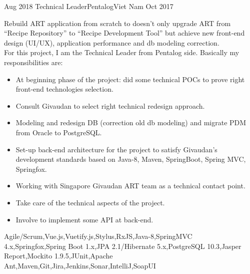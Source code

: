 \begin{experiences}
\experience
  {Aug 2018}  {Technical Leader}{Pentalog}{Viet Nam}
  {Oct 2017}  {  
Rebuild ART application from scratch to doesn't only upgrade ART from “Recipe Repository” to “Recipe Development Tool”  but achieve new front-end design (UI/UX), application performance and db modeling correction.\\
For this project, I am the Technical Leader from Pentalog side. Basically my responsibilities are:
	\begin{itemize}
        \item At beginning phase of the project: did some technical POCs to prove right front-end technologies selection.       
        \item Consult Givaudan to select right technical redesign approach.                         
        \item Modeling and redesign DB (correction old db modeling) and migrate PDM from Oracle to PostgreSQL.
        \item Set-up back-end architecture for the project to satisfy Givaudan’s development standards based on Java-8, Maven, SpringBoot, Spring MVC, Springfox.       
        \item Working with Singapore Givaudan ART team as a technical contact point.        
        \item Take care of the technical aspects of the project.
        \item Involve to implement some API at back-end.
	\end{itemize}
}
{Agile/Scrum,Vue.js,Vuetify.js,Stylus,RxJS,Java-8,SpringMVC 4.x,Springfox,Spring Boot 1.x,JPA 2.1/Hibernate 5.x,PostgreSQL 10.3,Jasper Report,Mockito 1.9.5,JUnit,Apache Ant,Maven,Git,Jira,Jenkins,Sonar,IntelliJ,SoapUI}
\emptySeparator


\end{experiences}
